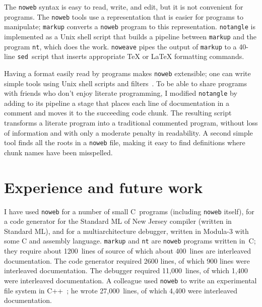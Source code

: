 The \verb+noweb+ syntax is easy to read, write, and edit, but it is
not convenient for programs.
The \verb+noweb+ tools use a representation that is easier for
programs to manipulate; \verb+markup+ converts a \verb+noweb+ program
to this representation.
\verb+notangle+ is implemented as a Unix shell script that builds a
pipeline between \verb+markup+ and the program \verb+nt+, which does
the work.
\verb+noweave+ pipes the output of \verb+markup+ to a 40-line
\verb+sed+~script that inserts appropriate {\TeX} or {\LaTeX} formatting commands.

Having a format easily read by programs makes {\tt noweb} extensible;
one can write simple tools using Unix shell scripts and
filters~\cite{kernighan:unix}. 
To be able to share programs with friends who don't enjoy literate
programming, I modified \verb+notangle+ by adding to its pipeline a
stage that
places each line of documentation in a comment and moves it to
the succeeding code chunk.  The resulting script transforms a literate
program into a traditional commented program, without loss of
information and with only a moderate penalty in readability.
A second simple tool finds all the roots in a {\tt noweb} file, making
it easy to find definitions where chunk names have been misspelled.

\section{Experience and future work}

I have used \verb+noweb+ for a number of small C~programs (including
\verb+noweb+ itself), for a code generator for 
the Standard ML of New Jersey compiler (written in Standard ML), and
for a multiarchitecture debugger, written in Modula-3 with some C and
assembly language.
\verb+markup+ and \verb+nt+ are \verb+noweb+ programs written in~C;
they require about 1200~lines of source of which about 400~lines are
interleaved documentation.
The code generator required 2600 lines, of which 900 lines were
interleaved documentation.
The debugger required 11,000~lines, of which 1,400 were interleaved
documentation.
A colleague used \verb+noweb+ to write an experimental file
system in C++~\cite{staelin:high}; he wrote 27,000~lines, of which
4,400 were interleaved documentation. 

